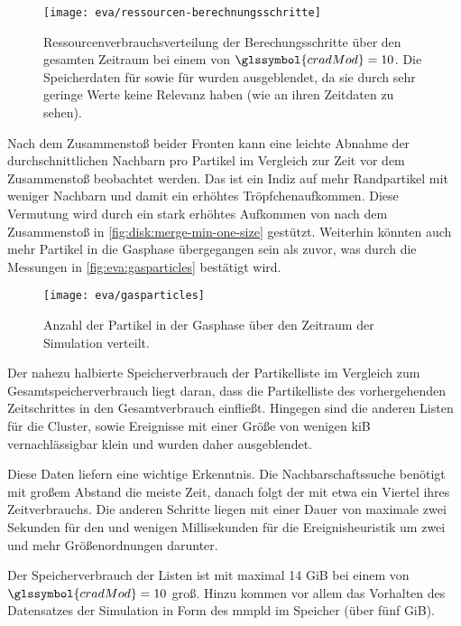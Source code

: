 \begin{figure}
	\texttt{[image: eva/ressourcen-berechnungsschritte]}
	\caption{Ressourcenverbrauchsverteilung der Berechungsschritte über den gesamten Zeitraum bei einem  von $\glssymbol{cradMod} = 10$. Die Speicherdaten für \SECC sowie für \DSE wurden ausgeblendet, da sie durch sehr geringe Werte keine Relevanz haben (wie an ihren Zeitdaten zu sehen).}\label{fig:eva:ressourcen-berechnungsschritte}
\end{figure}

Nach dem Zusammenstoß beider Fronten kann eine leichte Abnahme der durchschnittlichen Nachbarn pro Partikel im Vergleich zur Zeit vor dem Zusammenstoß beobachtet werden. Das ist ein Indiz auf mehr Randpartikel mit weniger Nachbarn und damit ein erhöhtes Tröpfchenaufkommen. Diese Vermutung wird durch ein stark erhöhtes Aufkommen von  nach dem Zusammenstoß in \autoref{fig:disk:merge-min-one-size} gestützt. Weiterhin könnten auch mehr Partikel in die Gasphase übergegangen sein als zuvor, was durch die Messungen in \autoref{fig:eva:gasparticles} bestätigt wird.

\begin{figure}
	\texttt{[image: eva/gasparticles]}
	\caption{Anzahl der Partikel in der Gasphase über den Zeitraum der Simulation verteilt.}\label{fig:eva:gasparticles}
\end{figure}

Der nahezu halbierte Speicherverbrauch der Partikelliste im Vergleich zum Gesamtspeicherverbrauch liegt daran, dass die Partikelliste des vorhergehenden Zeitschrittes in den Gesamtverbrauch einfließt. Hingegen sind die anderen Listen für die Cluster,  sowie Ereignisse mit einer Größe von wenigen \gls{kiB} vernachlässigbar klein und wurden daher ausgeblendet.

Diese Daten liefern eine wichtige Erkenntnis. Die Nachbarschaftssuche benötigt mit großem Abstand die meiste Zeit, danach folgt der \CFD mit etwa ein Viertel ihres Zeitverbrauchs. Die anderen Schritte liegen mit einer Dauer von maximale zwei Sekunden für den \SECC und wenigen Millisekunden für die Ereignisheuristik um zwei und mehr Größenordnungen darunter.

Der Speicherverbrauch der Listen ist mit maximal 14 \gls{GiB} bei einem  von $\glssymbol{cradMod} = 10$ groß. Hinzu kommen vor allem das Vorhalten des Datensatzes der Simulation in Form des \gls{mmpld} im Speicher (über fünf \gls{GiB}).

